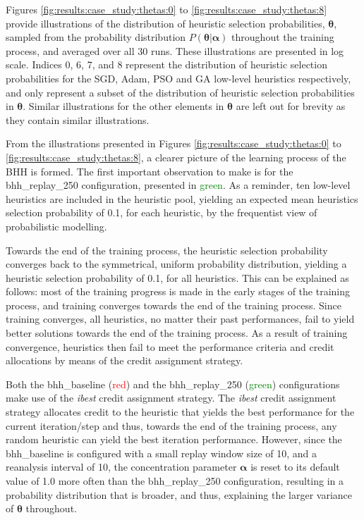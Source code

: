 Figures \ref{fig:results:case_study:thetas:0} to \ref{fig:results:case_study:thetas:8} provide illustrations of the distribution of heuristic selection probabilities, $\boldsymbol{\theta}$, sampled from the probability distribution $P(\boldsymbol{\theta} \vert \boldsymbol{\alpha})$ throughout the training process, and averaged over all 30 runs. These illustrations are presented in log scale. Indices 0, 6, 7, and 8 represent the distribution of heuristic selection probabilities for the \acs{SGD}, \acs{Adam}, \acs{PSO} and \acs{GA} low-level heuristics respectively, and only represent a subset of the distribution of heuristic selection probabilities in $\boldsymbol{\theta}$. Similar illustrations for the other elements in $\boldsymbol{\theta}$ are left out for brevity as they contain similar illustrations.

From the illustrations presented in Figures \ref{fig:results:case_study:thetas:0} to \ref{fig:results:case_study:thetas:8}, a clearer picture of the learning process of the \acs{BHH} is formed. The first important observation to make is for the bhh\_replay\_250 configuration, presented in \textcolor{green}{green}. As a reminder, ten low-level heuristics are included in the heuristic pool, yielding an expected mean heuristics selection probability of 0.1, for each heuristic, by the frequentist view of probabilistic modelling.

Towards the end of the training process, the heuristic selection probability converges back to the symmetrical, uniform probability distribution, yielding a heuristic selection probability of 0.1, for all heuristics. This can be explained as follows: most of the training progress is made in the early stages of the training process, and training converges towards the end of the training process. Since training converges, all heuristics, no matter their past performances, fail to yield better solutions towards the end of the training process. As a result of training convergence, heuristics then fail to meet the performance criteria and credit allocations by means of the credit assignment strategy.

Both the bhh\_baseline (\textcolor{red}{red}) and the bhh\_replay\_250 (\textcolor{green}{green}) configurations make use of the \textit{ibest} credit assignment strategy. The \textit{ibest} credit assignment strategy allocates credit to the heuristic that yields the best performance for the current iteration/step and thus, towards the end of the training process, any random heuristic can yield the best iteration performance. However, since the bhh\_baseline is configured with a small replay window size of 10, and a reanalysis interval of 10, the concentration parameter $\boldsymbol{\alpha}$ is reset to its default value of 1.0 more often than the bhh\_replay\_250 configuration, resulting in a probability distribution that is broader, and thus, explaining the larger variance of $\boldsymbol{\theta}$ throughout.

